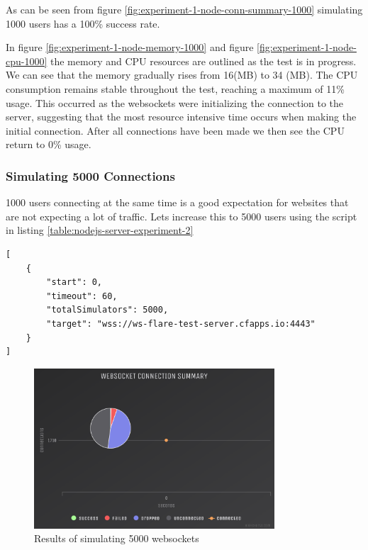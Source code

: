As can be seen from figure \ref{fig:experiment-1-node-conn-summary-1000} simulating 1000 users has a 100\% success rate.

In figure \ref{fig:experiment-1-node-memory-1000} and figure \ref{fig:experiment-1-node-cpu-1000} the memory and CPU resources are outlined as the test is in progress. We can see that the memory gradually rises from 16(MB) to 34 (MB). The CPU consumption remains stable throughout the test, reaching a maximum of 11\% usage. This occurred as the websockets were initializing the connection to the server, suggesting that the most resource intensive time occurs when making the initial connection. After all connections have been made we then see the CPU return to 0\% usage. 

\subsubsection{Simulating 5000 Connections}

1000 users connecting at the same time is a good expectation for websites that are not expecting a lot of traffic. Lets increase this to 5000 users using the script in listing \ref{table:nodejs-server-experiment-2}

\begin{listing}[H]
    \caption{WS-Flare test script for 5000 users}
    \label{table:nodejs-server-experiment-2}
    \begin{verbatim}
[
    {
        "start": 0,
        "timeout": 60,
        "totalSimulators": 5000,
        "target": "wss://ws-flare-test-server.cfapps.io:4443"
    }
]
\end{verbatim}
\end{listing}

\begin{figure}[H]
  \centering
    \includegraphics[width=0.8\textwidth]{figures/experiments/experiment-1/node-js/conn-summary-5000.png}
    \caption{Results of simulating 5000 websockets}
    \label{fig:experiment-1-conn-summary-5000}
\end{figure}

